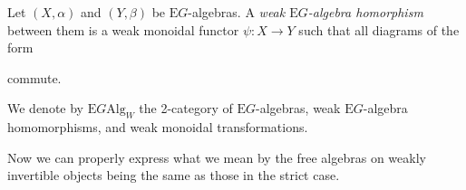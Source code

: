 \begin{defn}\label{weakmonfunc} Let $(X, \alpha)$ and $(Y, \beta)$ be $\mathrm{E}G$-algebras. A \emph{weak $\mathrm{E}G$-algebra homorphism} between them is a weak monoidal functor $\psi: X \to Y$ such that all diagrams of the form
\begin{eq*}  \end{eq*}
commute.
\end{defn} 

\begin{defn} We denote by $\mathrm{E}G\mathrm{Alg}_W$ the 2-category of $\mathrm{E}G$-algebras, weak $\mathrm{E}G$-algebra homomorphisms, and weak monoidal transformations.\end{defn}

Now we can properly express what we mean by the free algebras on weakly invertible objects being the same as those in the strict case.

